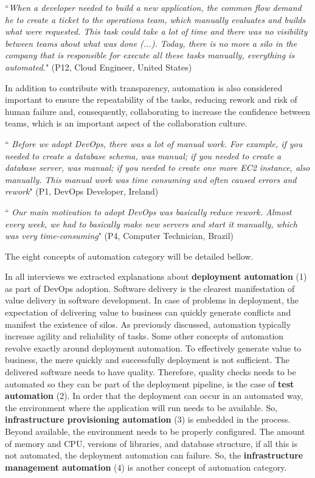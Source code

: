\begin{mq}
``\emph{When a developer needed to build a new application, the common flow demand he
to create a ticket to the operations team, which manually evaluates and builds
what were requested. This task could take a lot of time and there was no
visibility between teams about what was done (...). Today, there is no more a
silo in the company that is responsible for execute all these tasks manually,
everything is automated.}" (P12, Cloud Engineer, United States)
\end{mq}

In addition to contribute with transparency, automation is also considered
important to ensure the repeatability of the tasks, reducing rework and risk of
human failure and, consequently, collaborating to increase the confidence
between teams, which is an important aspect of the collaboration culture.

\begin{mq}
``\emph{
Before we adopt DevOps, there was a lot of manual work. For example, if you
needed to create a database schema, was manual; if you needed to create a
database server, was manual; if you needed to create one more EC2 instance,
also manually. This manual work was time consuming and often caused errors and
rework}" (P1, DevOps Developer, Ireland)
\end{mq}

\begin{mq}
``\emph{
Our main motivation to adopt DevOps was basically reduce rework. Almost every
week, we had to basically make new servers and start it manually, which was
very time-consuming}" (P4, Computer Technician, Brazil)
\end{mq}

The eight concepts of automation category will be detailed bellow.

In all interviews we extracted explanations about \textbf{deployment
automation} (1) as part of DevOps adoption. Software delivery is the clearest
manifestation of value delivery in software development. In case of problems
in deployment, the expectation of delivering value to business can quickly
generate conflicts and manifest the existence of silos. As previously discussed,
automation typically increase agility and reliability of tasks. Some other
concepts of automation revolve exactly around deployment automation. To
effectively generate value to business, the mere quickly and successfully
deployment is not sufficient. The delivered software needs to have quality.
Therefore, quality checks needs to be automated so they can be part of the
deployment pipeline, is the case of \textbf{test automation} (2). In order
that the deployment can occur in an automated way, the environment where the
application will run needs to be available. So, \textbf{infrastructure
provisioning automation} (3) is embedded in the process. Beyond available,
the environment needs to be properly configured. The amount of memory and CPU,
versions of libraries, and database structure, if all this is not automated,
the deployment automation can failure. So, the \textbf{infrastructure management
automation} (4) is another concept of automation category.

